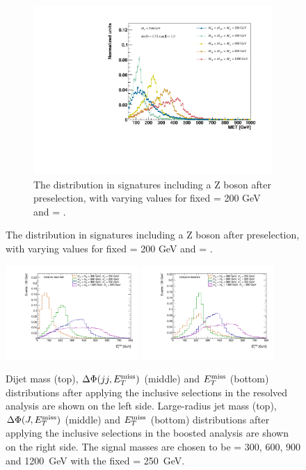 \begin{figure}%
	\centering

    \begin{subfigure}[t]{0.75\textwidth}
	\centering
	\includegraphics[width=\textwidth]{texinputs/04_grid/figures/monoz/leptonic/mAscan_for_ma200_axis.pdf}	
	\caption{The \MET distribution in signatures including a Z boson after preselection, with varying \mA values for fixed \ma = 200 GeV and \mA = \mH. \label{fig:monoz_ll_mA_scan}}
    \end{subfigure}

\end{figure}

\begin{figure}
\centering
\includegraphics[width=0.45\textwidth]{texinputs/04_grid/figures/monoz/hadronic/ma250_incl_resl_MET_linear.pdf}
\includegraphics[width=0.45\textwidth]{texinputs/04_grid/figures/monoz/hadronic/ma250_incl_merged_MET_linear.pdf}
\caption{Dijet mass (top), $\Delta\Phi(jj, E_T^\mathrm{miss})$ (middle) and $E_T^\mathrm{miss}$ (bottom) distributions 
after applying the inclusive selections in the resolved analysis are shown on the left side. Large-radius 
jet mass (top), $\Delta\Phi(J, E_T^\mathrm{miss})$ (middle) and $E_T^\mathrm{miss}$ (bottom) distributions 
after applying the inclusive selections in the boosted analysis are shown on the right side. 
The signal masses are chosen to be \mA = 300, 600, 900 and 1200~GeV with the fixed \ma = 250~GeV.}
\label{fig:monozhad_kin_inc_fixed_ma}
\end{figure}

